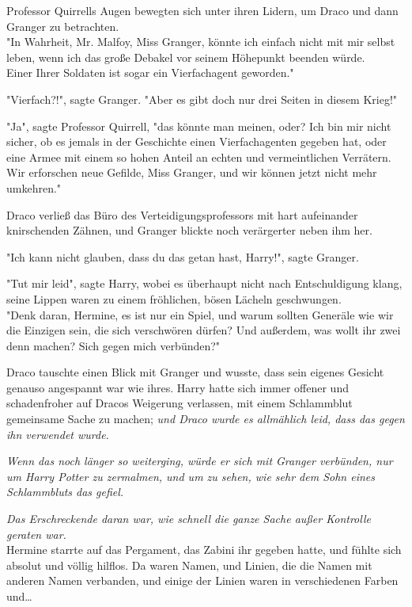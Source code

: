 {Professor Quirrells Augen bewegten sich unter ihren Lidern, um Draco und dann Granger zu betrachten.\\ "In Wahrheit, Mr. Malfoy, Miss Granger, könnte ich einfach nicht mit mir selbst leben, wenn ich das große Debakel vor seinem Höhepunkt beenden würde.\\ Einer Ihrer Soldaten ist sogar ein Vierfachagent geworden."

"Vierfach?!", sagte Granger. "Aber es gibt doch nur drei Seiten in diesem Krieg!"

"Ja", sagte Professor Quirrell, "das könnte man meinen, oder? Ich bin mir nicht sicher, ob es jemals in der Geschichte einen Vierfachagenten gegeben hat, oder eine Armee mit einem so hohen Anteil an echten und vermeintlichen Verrätern.\\ Wir erforschen neue Gefilde, Miss Granger, und wir können jetzt nicht mehr umkehren."

Draco verließ das Büro des Verteidigungsprofessors mit hart aufeinander knirschenden Zähnen, und Granger blickte noch verärgerter neben ihm her.

"Ich kann nicht glauben, dass du das getan hast, Harry!", sagte Granger.

"Tut mir leid", sagte Harry, wobei es überhaupt nicht nach Entschuldigung klang, seine Lippen waren zu einem fröhlichen, bösen Lächeln geschwungen.\\ "Denk daran, Hermine, es ist nur ein Spiel, und warum sollten Generäle wie wir die Einzigen sein, die sich verschwören dürfen? Und außerdem, was wollt ihr zwei denn machen? Sich gegen mich verbünden?"

Draco tauschte einen Blick mit Granger und wusste, dass sein eigenes Gesicht genauso angespannt war wie ihres. Harry hatte sich immer offener und schadenfroher auf Dracos Weigerung verlassen, mit einem Schlammblut gemeinsame Sache zu machen; \emph{und Draco wurde es allmählich leid, dass das gegen ihn verwendet wurde.}

\emph{Wenn das noch länger so weiterging, würde er sich mit Granger verbünden, nur um Harry Potter zu zermalmen, und um zu sehen, wie sehr dem Sohn eines Schlammbluts das gefiel.}

\emph{Das Erschreckende daran war, wie schnell die ganze Sache außer Kontrolle geraten war.}\\ Hermine starrte auf das Pergament, das Zabini ihr gegeben hatte, und fühlte sich absolut und völlig hilflos. Da waren Namen, und Linien, die die Namen mit anderen Namen verbanden, und einige der Linien waren in verschiedenen Farben und…

}
